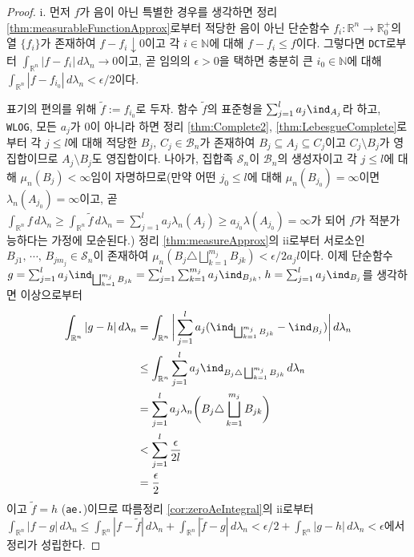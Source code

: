 \begin{proof}
    i. 먼저 $f$가 음이 아닌 특별한 경우를 생각하면 정리 \ref{thm:measurableFunctionApprox}로부터 적당한 음이 아닌 단순함수 $f_i:\mathbb{R}^n\to\mathbb{R}^+_0$의 열 $\{f_i\}$가 존재하여 $f-f_i\downarrow0$이고 각 $i\in\mathbb{N}$에 대해 $f-f_i\leq f$이다. 그렇다면 \texttt{DCT}로부터 $\int_{\mathbb{R}^n}|f-f_i|\,d\lambda_n\to0$이고, 곧 임의의 $\epsilon>0$을 택하면 충분히 큰 $i_0\in\mathbb{N}$에 대해 $\int_{\mathbb{R}^n}|f-f_{i_0}|\,d\lambda_n<\epsilon/2$이다.

    표기의 편의를 위해 $\widetilde{f}:=f_{i_0}$로 두자. 함수 $\widetilde{f}$의 표준형을 $\sum_{j=1}^la_j\ind_{A_j}$라 하고, \texttt{WLOG}, 모든 $a_j$가 $0$이 아니라 하면 정리 \ref{thm:Complete2}, \ref{thm:LebesgueComplete}로부터 각 $j\leq l$에 대해 적당한 $B_j,\,C_j\in\mathcal{B}_n$가 존재하여 $B_j\subseteq A_j\subseteq C_j$이고 $C_j\setminus B_j$가 영집합이므로 $A_j\setminus B_j$도 영집합이다. 나아가, 집합족 $\mathcal{S}_n$이 $\mathcal{B}_n$의 생성자이고 각 $j\leq l$에 대해 $\mu_n(B_j)<\infty$임이 자명하므로(만약 어떤 $j_0\leq l$에 대해 $\mu_n(B_{j_0})=\infty$이면 $\lambda_n(A_{j_0})=\infty$이고, 곧 $\int_{\mathbb{R}^n}f\,d\lambda_n\geq\int_{\mathbb{R}^n}\widetilde{f}\,d\lambda_n=\sum_{j=1}^la_j\lambda_n(A_j)\geq a_{j_0}\lambda(A_{j_0})=\infty$가 되어 $f$가 적분가능하다는 가정에 모순된다.) 정리 \ref{thm:measureApprox}의 ii로부터 서로소인 $B_{j1},\,\cdots,\,B_{jm_j}\in\mathcal{S}_n$이 존재하여 $\mu_n(B_j\triangle\bigsqcup_{k=1}^{m_j}B_{jk})<\epsilon/2a_jl$이다. 이제 단순함수 $g=\sum_{j=1}^la_j\ind_{\bigsqcup_{k=1}^{m_j}B_{jk}}=\sum_{j=1}^l\sum_{k=1}^{m_j}a_j\ind_{B_{jk}},\,h=\sum_{j=1}^la_j\ind_{B_j}$를 생각하면 이상으로부터
    \begin{align*}
        \int_{\mathbb{R}^n}|g-h|\,d\lambda_n&=\int_{\mathbb{R}^n}\bigg|\sum_{j=1}^la_j(\ind_{\bigsqcup_{k=1}^{m_j}B_{jk}}-\ind_{B_j})\bigg|\,d\lambda_n\\
        &\leq\int_{\mathbb{R}^n}\sum_{j=1}^la_j\ind_{B_j\triangle\bigsqcup_{k=1}^{m_j}B_{jk}}\,d\lambda_n\\
        &=\sum_{j=1}^la_j\lambda_n\bigg(B_j\triangle\bigsqcup_{k=1}^{m_j}B_{jk}\bigg)\\
        &<\sum_{j=1}^l\frac{\epsilon}{2l}\\
        &=\frac{\epsilon}{2}
    \end{align*}
    이고 $\widetilde{f}=h$ (\texttt{ae.})이므로 따름정리 \ref{cor:zeroAeIntegral}의 ii로부터 $\int_{\mathbb{R}^n}|f-g|\,d\lambda_n\leq\int_{\mathbb{R}^n}|f-\widetilde{f}|\,d\lambda_n+\int_{\mathbb{R}^n}|\widetilde{f}-g|\,d\lambda_n<\epsilon/2+\int_{\mathbb{R}^n}|g-h|\,d\lambda_n<\epsilon$에서 정리가 성립한다.


\end{proof}
